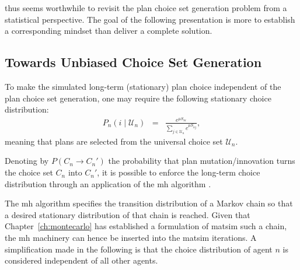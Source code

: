  thus seems worthwhile to revisit the plan choice set generation
%
%
problem from a statistical perspective. 
The goal of the following presentation is more to establish a corresponding 
mindset\corr{,}{} than  deliver a complete solution.

\subsection{Towards Unbiased Choice Set Generation}


To make the simulated long-term (stationary) plan choice independent of the plan
choice set generation, one may require the following stationary choice
distribution:
\begin{eqnarray}
P_{n}(i\mid \mathcal{U}_n) & = & \frac{e^{\mu S_{ni}}}{\sum_{j\in \mathcal{U}_n}e^{\mu S_{nj}}},
\label{eq:global-choice-model}
\end{eqnarray}
meaning that plans are selected from the universal choice set $\mathcal{U}_n$.

Denoting by $P(C_{n}\rightarrow C_{n}')$ the probability
that plan mutation/innovation turns the choice set $C_{n}$ into $C_{n}'$,
it is possible to enforce the long-term choice distribution 
through an application of the \gls{mh} algorithm \citep[][see also \citet{floetteroed-2012b} for a related approach to a similar
problem]{hastings-1970}.

The \gls{mh} algorithm specifies the transition distribution
of a Markov chain\corr{,}{} so that a desired stationary distribution of that
chain is reached. Given that Chapter~\ref{ch:montecarlo} has established
a formulation of \gls{matsim}  such a chain, the \gls{mh}
machinery can hence be inserted into the \gls{matsim} iterations. A simplification made in
the following is that the choice distribution of agent $n$ is considered
independent of all other agents.

